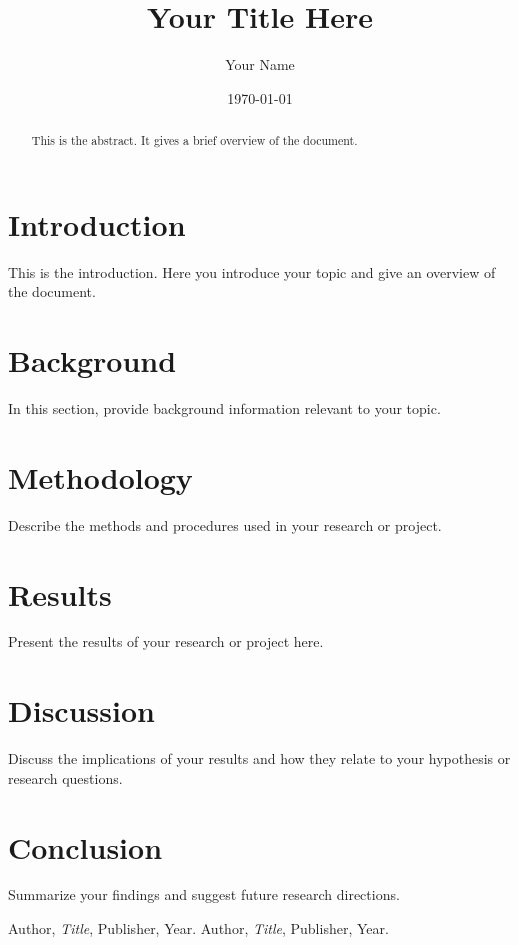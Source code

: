 \documentclass[12pt]{article}
\begin{document}
\title{Your Title Here}
\author{Your Name}
\date{\today}
\maketitle

\begin{abstract}
    This is the abstract. It gives a brief overview of the document.
\end{abstract}

\tableofcontents
\newpage

\section{Introduction}
This is the introduction. Here you introduce your topic and give an overview of the document.

\section{Background}
In this section, provide background information relevant to your topic.

\section{Methodology}
Describe the methods and procedures used in your research or project.

\section{Results}
Present the results of your research or project here.

\section{Discussion}
Discuss the implications of your results and how they relate to your hypothesis or research questions.

\section{Conclusion}
Summarize your findings and suggest future research directions.

\newpage
\begin{thebibliography}{99}
     Author, \emph{Title}, Publisher, Year.
     Author, \emph{Title}, Publisher, Year.
\end{thebibliography}
\end{document}
